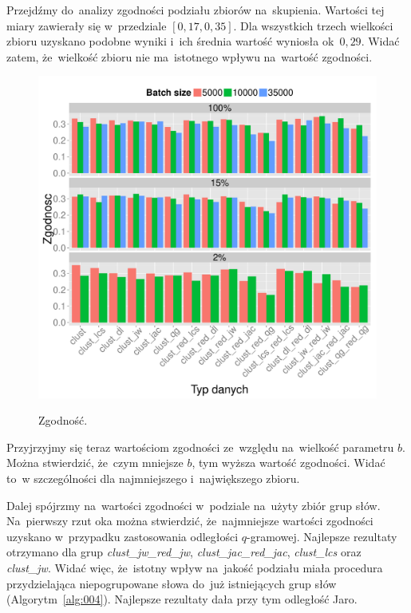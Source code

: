 \documentclass{praca1}
\begin{document}
Przejdźmy do~analizy zgodności podziału zbiorów na~skupienia. Wartości tej miary zawierały się w~przedziale $[0,17, 0,35]$. Dla wszystkich trzech wielkości zbioru uzyskano podobne wyniki i~ich średnia wartość wyniosła ok~$0,29$. Widać zatem, że~wielkość zbioru nie ma~istotnego wpływu na~wartość zgodności.


\begin{figure}[!h]
  \centering
  \includegraphics[width=420pt]{plot11.pdf}\\
  \caption{Zgodność.}\label{plot:006}
\end{figure}

Przyjrzyjmy się teraz wartościom zgodności ze~względu na~wielkość parametru $b$. Można stwierdzić, że~czym mniejsze $b$, tym wyższa wartość zgodności. Widać to~w szczególności dla najmniejszego i~największego zbioru.

Dalej spójrzmy na~wartości zgodności w~podziale na~użyty zbiór grup słów. Na~pierwszy rzut oka można stwierdzić, że~najmniejsze wartości zgodności uzyskano w~przypadku zastosowania odległości $q$-gramowej. Najlepsze rezultaty otrzymano dla grup \emph{clust\_jw\_red\_jw}, \emph{clust\_jac\_red\_jac}, \emph{clust\_lcs} oraz \emph{clust\_jw}. Widać więc, że~istotny wpływ na~jakość podziału miała procedura przydzielająca niepogrupowane słowa do~już istniejących grup słów (Algorytm~\ref{alg:004}). Najlepsze rezultaty dała przy tym odległość Jaro.
\end{document}
